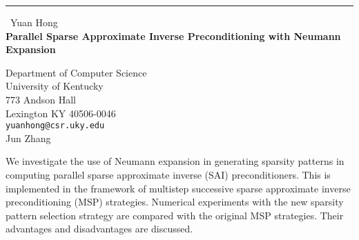 \documentclass{report}
\begin{document}
\begin{center}
\rule{6in}{1pt} \
{\large Yuan Hong \\
{\bf Parallel Sparse Approximate Inverse Preconditioning with Neumann Expansion}}

Department of Computer Science \\ University of Kentucky \\ 773 Andson Hall \\ Lexington KY 40506-0046
\\
{\tt yuanhong@csr.uky.edu}\\
Jun Zhang\end{center}

We investigate the use of Neumann expansion in generating sparsity patterns
in computing parallel sparse approximate inverse (SAI) preconditioners. This
is implemented in the framework of multistep successive
sparse approximate inverse preconditioning (MSP) strategies.
Numerical experiments with the new sparsity pattern
selection strategy are compared with
the original MSP strategies. Their
advantages and disadvantages are discussed.
\end{document}
